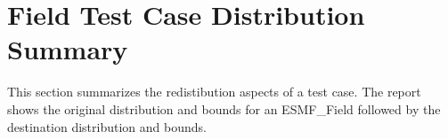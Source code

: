 \section{Field Test Case Distribution Summary}
This section summarizes the redistibution aspects of a test case. The report shows the original distribution and bounds for an ESMF\_Field followed by the destination distribution and bounds.

